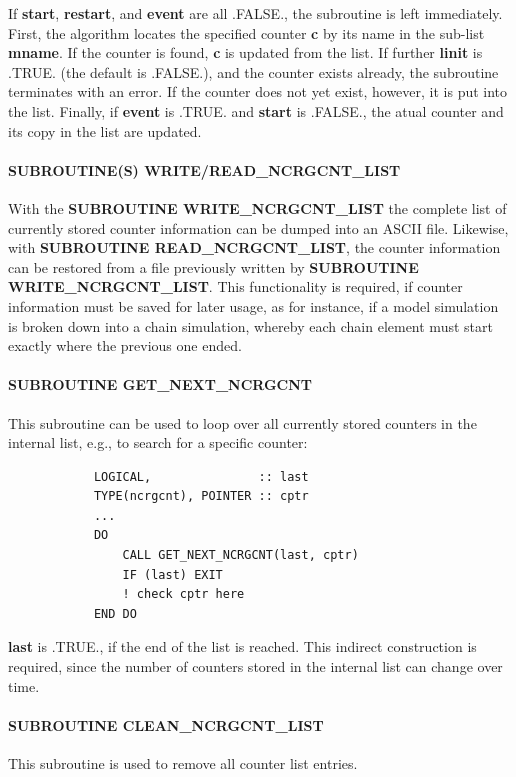 \documentclass[12pt, a4paper]{article}
\begin{document}
%
If {\bf start}, {\bf restart}, and {\bf event} are all .FALSE.,
the subroutine is left immediately.
First, the algorithm locates the specified counter {\bf c} by its name
in the sub-list {\bf mname}. If the counter is found, {\bf c} is updated from
the list. If further {\bf linit} is .TRUE. (the default is .FALSE.),
and the counter exists already, the subroutine terminates with an error.
If the counter does not yet exist, however, it is put into the list.
Finally, if {\bf event} is .TRUE.
and {\bf start} is .FALSE., the atual counter and its copy in the list
are updated.

\paragraph{{\bf SUBROUTINE(S) WRITE/READ\_NCRGCNT\_LIST}}
%
With the {\bf SUBROUTINE WRITE\_NCRGCNT\_LIST} the complete list
of currently stored counter information can be dumped into an ASCII file.
Likewise, with {\bf SUBROUTINE READ\_NCRGCNT\_LIST}, the counter information
can be restored from a file previously written by
{\bf SUBROUTINE WRITE\_NCRGCNT\_LIST}.
%
This functionality is required, if
counter information must be saved for later usage, as for instance,
if a model simulation is broken down into a chain simulation, whereby
each chain element must start exactly where the previous one ended.

\paragraph{{\bf SUBROUTINE GET\_NEXT\_NCRGCNT}}
%
This subroutine can be used to loop over all currently stored counters
in the internal list, e.g., to search for a specific counter:
%
\begin{verbatim}
            LOGICAL,               :: last
            TYPE(ncrgcnt), POINTER :: cptr
            ...
            DO
                CALL GET_NEXT_NCRGCNT(last, cptr)
                IF (last) EXIT
                ! check cptr here
            END DO
\end{verbatim}
%
{\bf last} is .TRUE., if the end of the list is reached.
This indirect construction is required, since the number of counters
stored in the internal list can change over time.

\paragraph{{\bf SUBROUTINE CLEAN\_NCRGCNT\_LIST}}
%
This subroutine is used to remove all counter list entries.
\end{document}
